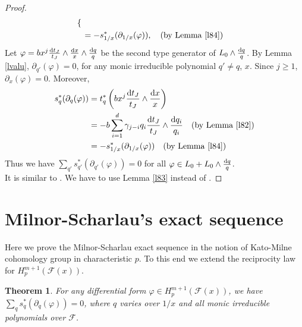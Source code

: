 \documentclass[times,10pt]{amsart}
\newcommand{\dd}{{\rm d}}
\newcommand{\F}{\ensuremath{\mathcal{F}}}
\renewcommand{\phi}{\varphi}
\newtheorem{thm}{Theorem}[section]
\begin{document}
\begin{proof}
\begin{align*}
\begin{cases}
         \end{cases}\\&= -s_{1/x}^*(\partial_{1/x}(\phi)),\quad \text{(by Lemma \ref{l84})}
     \end{align*} Let $\phi= bx^j \frac{\dd t_J}{t_J}\wedge \frac{\dd x}{x}\wedge \frac{\dd q}{q}$ be the second type generator of $L_0\wedge \frac{\dd q}{q}$.   By Lemma \ref{lvalu}, $\partial_{q'}(\phi)=0$, for any monic irreducible polynomial $q'\neq q$, $x$. Since $j\geq 1$, $\partial_{x}(\phi)=0$.  Moreover, 
     \begin{align*}
         s_q^*(\partial_q(\phi))&= t_q^*\left(  bx^j \frac{\dd t_J}{t_J}\wedge \frac{\dd x}{x}\right)\\&= -b\sum_{i=1}^{d} \gamma_{j-i} q_i \frac{\dd t_J}{t_J}\wedge \frac{\dd q_i}{q_i}\quad \text{(by Lemma \ref{l82})}\\ &= -s_{1/x}^*(\partial_{1/x}(\phi))\quad \text{(by Lemma \ref{l84})}
     \end{align*} Thus we have  $\sum_{q'} s^*_{q'}(\partial_{q'}(\phi))=0$ for all $\phi\in L_0+ L_0\wedge \frac{\dd q}{q}$.\\

     It is  similar to \cite[Lemma 4.4, (ii)]{Laghribi-Maiti}. We have to use Lemma \ref{l83} instead of \cite[Lemma 4.2 (iii)]{Laghribi-Maiti}.
 \end{proof}
 
 

 \section{Milnor-Scharlau's exact sequence}\label{5sms}
 
 Here we prove   the Milnor-Scharlau exact sequence in the notion of Kato-Milne cohomology group in characteristic $p$. To this end we  extend the reciprocity law for $H_p^{m+1}(\F(x))$.
 \begin{thm}\label{thms}     For any differential form $\phi\in H_p^{m+1}(\F(x))$, we have $ \sum_{q}s^*_{q}(\partial_q(\phi))=0$, where $q$ varies over  $1/x$ and all monic irreducible polynomials over $\F$.
     \end{thm}
\end{document}
